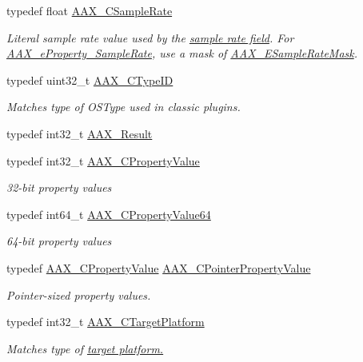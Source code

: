 \begin{DoxyCompactItemize}
typedef float \hyperlink{a00149_a3d9eea08f47e0b0a23432e15baa4e885}{A\+A\+X\+\_\+\+C\+Sample\+Rate}
\begin{DoxyCompactList}\small\item\em Literal sample rate value used by the \hyperlink{a00088_adbd57beaa0a3143d3cf44b93ecdb59ec}{sample rate field}. For \hyperlink{a00283_a6571f4e41a5dd06e4067249228e2249eac5294e2feb18587d57b6ca0216a6bb1e}{A\+A\+X\+\_\+e\+Property\+\_\+\+Sample\+Rate}, use a mask of \hyperlink{a00206_a5bb98259de21d2c4d04a2d6010d757c7}{A\+A\+X\+\_\+\+E\+Sample\+Rate\+Mask}. \end{DoxyCompactList}\item 
typedef uint32\+\_\+t \hyperlink{a00149_ac678f9c1fbcc26315d209f71a147a175}{A\+A\+X\+\_\+\+C\+Type\+I\+D}
\begin{DoxyCompactList}\small\item\em Matches type of O\+S\+Type used in classic plugins. \end{DoxyCompactList}\item 
typedef int32\+\_\+t \hyperlink{a00149_a4d8f69a697df7f70c3a8e9b8ee130d2f}{A\+A\+X\+\_\+\+Result}
\item 
typedef int32\+\_\+t \hyperlink{a00149_ab247c0d8686c14e05cbb567ef276f249}{A\+A\+X\+\_\+\+C\+Property\+Value}
\begin{DoxyCompactList}\small\item\em 32-\/bit property values \end{DoxyCompactList}\item 
typedef int64\+\_\+t \hyperlink{a00149_a49471789032304f99ac1af8c15a87313}{A\+A\+X\+\_\+\+C\+Property\+Value64}
\begin{DoxyCompactList}\small\item\em 64-\/bit property values \end{DoxyCompactList}\item 
typedef \hyperlink{a00149_ab247c0d8686c14e05cbb567ef276f249}{A\+A\+X\+\_\+\+C\+Property\+Value} \hyperlink{a00149_a7abe263a7521e988ed4ee4ac691ed5f9}{A\+A\+X\+\_\+\+C\+Pointer\+Property\+Value}
\begin{DoxyCompactList}\small\item\em Pointer-\/sized property values. \end{DoxyCompactList}\item 
typedef int32\+\_\+t \hyperlink{a00149_a8f2cefa455217fa9f3ce190fe5fd8033}{A\+A\+X\+\_\+\+C\+Target\+Platform}
\begin{DoxyCompactList}\small\item\em Matches type of \hyperlink{a00206_a19e8cc27f59bb9bb4039b00fadb3cb83}{target platform.}\end{DoxyCompactList}\item 

\end{DoxyCompactItemize}

